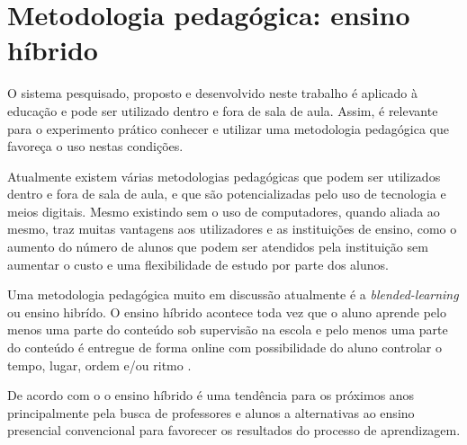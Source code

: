
\section{Metodologia pedagógica: ensino híbrido}
\label{sec:flipped}


O sistema pesquisado, proposto e desenvolvido neste trabalho é aplicado à educação e pode ser utilizado dentro e fora de sala de aula. Assim, é relevante para o experimento prático conhecer e utilizar uma metodologia pedagógica que favoreça o uso nestas condições.

Atualmente existem várias metodologias pedagógicas que podem ser utilizados dentro e fora de sala de aula, e que são potencializadas pelo uso de tecnologia e meios digitais. Mesmo existindo sem o uso de computadores, quando aliada ao mesmo, traz muitas vantagens aos utilizadores e as instituições de ensino, como o aumento do número de alunos que podem ser atendidos pela instituição sem aumentar o custo e uma flexibilidade de estudo por parte dos alunos. 

Uma metodologia pedagógica muito em discussão atualmente é a \emph{blended-learning} ou ensino hibrído. O ensino híbrido acontece toda vez que o aluno aprende pelo menos uma parte do conteúdo sob supervisão na escola e pelo menos uma parte do conteúdo é entregue de forma online com possibilidade do aluno controlar o tempo, lugar, ordem e/ou ritmo \cite{horn_rise_2011}.

De acordo com o  o ensino híbrido é uma tendência para os próximos anos principalmente pela busca de professores e alunos a alternativas ao ensino presencial convencional para favorecer os resultados do processo de aprendizagem.

